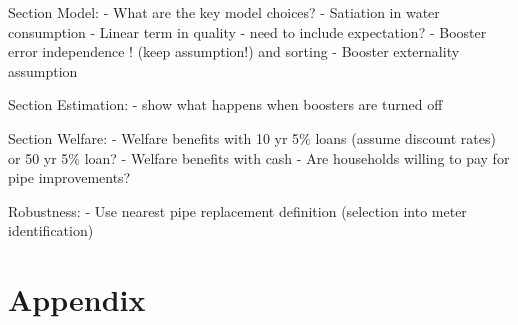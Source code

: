 \documentclass[12pt,table]{article}
\begin{document}




Section Model:
	- What are the key model choices?
		- Satiation in water consumption
		- Linear term in quality
			- need to include expectation?
		- Booster error independence ! (keep assumption!) and sorting
		- Booster externality assumption


Section Estimation:
	- show what happens when boosters are turned off


Section Welfare:
	- Welfare benefits with 10 yr 5\% loans (assume discount rates) or 50 yr 5\% loan?
	- Welfare benefits with cash
	- Are households willing to pay for pipe improvements?


Robustness:
	- Use nearest pipe replacement definition (selection into meter identification)





\section{Appendix}
\end{document}
